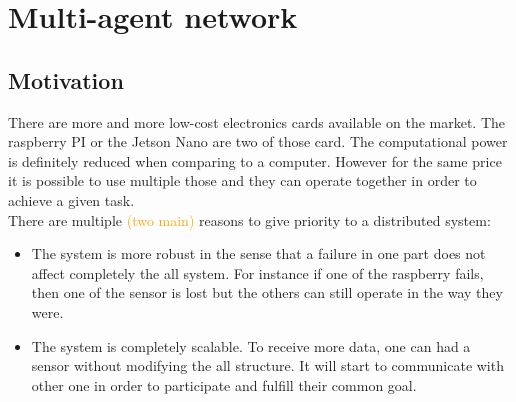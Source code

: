 \newpage
\section{Multi-agent network}


\subsection{Motivation}

There are more and more low-cost electronics cards available on the market. The raspberry PI or the Jetson Nano are two of those card. The computational power is definitely reduced when comparing to a computer. However for the same price it is possible to use multiple those and they can operate together in order to achieve a given task.\\

There are multiple  \textcolor{orange}{(two main)} reasons to give priority to a distributed system:
\begin{itemize}
    \item The system is more robust in the sense that a failure in one part does not affect completely the all system. For instance if one of the raspberry fails, then one of the sensor is lost but the others can still operate in the way they were. 
    \item The system is completely scalable. To receive more data, one can had a sensor without modifying the all structure. It will start to communicate with other one in order to participate and fulfill their common goal. 
\end{itemize}



